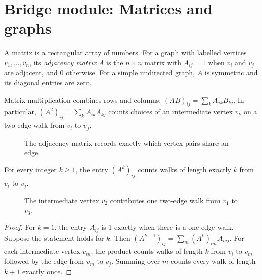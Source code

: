 \chapter*{Bridge module: Matrices and graphs}
A matrix is a rectangular array of numbers. For a graph with labelled vertices $v_1,\ldots,v_n$, its \emph{adjacency matrix} $A$ is the $n\times n$ matrix with $A_{ij}=1$ when $v_i$ and $v_j$ are adjacent, and 0 otherwise. For a simple undirected graph, $A$ is symmetric and its diagonal entries are zero.

Matrix multiplication combines rows and columns: $(AB)_{ij}=\sum_k A_{ik}B_{kj}$. In particular, $(A^2)_{ij}=\sum_k A_{ik}A_{kj}$ counts choices of an intermediate vertex $v_k$ on a two-edge walk from $v_i$ to $v_j$.

\begin{figure}[htbp]
\centering
{}
\caption{The adjacency matrix records exactly which vertex pairs share an edge.}
\end{figure}

\begin{theorem}
For every integer $k\geq 1$, the entry $(A^k)_{ij}$ counts walks of length exactly $k$ from $v_i$ to $v_j$.
\end{theorem}
\begin{figure}[htbp]
\centering
{}
\caption{The intermediate vertex $v_2$ contributes one two-edge walk from $v_1$ to $v_3$.}
\end{figure}
\begin{proof}
For $k=1$, the entry $A_{ij}$ is 1 exactly when there is a one-edge walk. Suppose the statement holds for $k$. Then $(A^{k+1})_{ij}=\sum_m(A^k)_{im}A_{mj}$. For each intermediate vertex $v_m$, the product counts walks of length $k$ from $v_i$ to $v_m$ followed by the edge from $v_m$ to $v_j$. Summing over $m$ counts every walk of length $k+1$ exactly once.
\end{proof}

